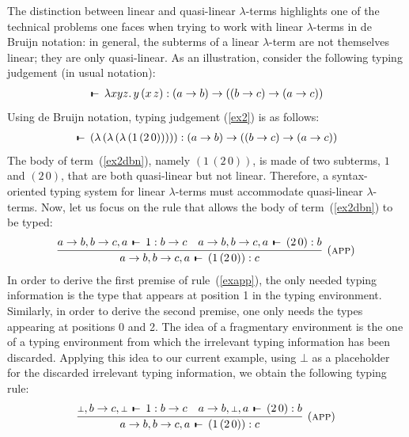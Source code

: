 \documentclass[submission,creativecommons]{eptcs}
\def\joinrelm{\mathrel{\mkern-3mu}}
\def\relbar{\mathrel{\smash-}}
\def\tailpiece{\mathchoice
  {\vrule height 1ex width 0.3ex depth -.1ex}%
  {\vrule height 1ex width 0.3ex depth -.1ex}%
  {\vrule height 0.7ex width 0.3ex depth -.1ex}%
  {\vrule height 0.7ex width 0.3ex depth -.1ex}}
\def\seqsym{\mathrel{\tailpiece\joinrelm\relbar}}
\newcommand{\bt}{{\scriptstyle\bot}}
\newcommand{\iabs}[1]{(\lambda\,#1)}
\newcommand{\iapp}[2]{(#1\,#2)}
\newcommand{\tseq}[3]{#1 \, \seqsym \, #2 : #3}
\begin{document}
The distinction between linear and quasi-linear $\lambda$-terms highlights one of the technical problems one
faces when trying to work with linear $\lambda$-terms in de Bruijn notation: in general, the subterms of a
linear $\lambda$-term are not themselves linear; they are only quasi-linear.
As an illustration, consider the following typing judgement (in usual notation):
\begin{align}\label{ex2}
\tseq{}{\lambda x y z.\,y\,(x\,z)}{(a\rightarrow b)\rightarrow((b\rightarrow c)\rightarrow(a\rightarrow c))}
\end{align}
Using de Bruijn notation, typing judgement (\ref{ex2}) is as follows:
\begin{align}\label{ex2dbn}
  \tseq{}
    {\iabs{\iabs{\iabs{\iapp{1}{\iapp{2}{0}}}}}}
    {(a\rightarrow b)\rightarrow((b\rightarrow c)\rightarrow(a\rightarrow c))}
\end{align}
The body of term~(\ref{ex2dbn}), namely $\iapp{1}{\iapp{2}{0}}$, is made of two subterms, $1$ and $\iapp{2}{0}$,
that are both quasi-linear but not linear.
Therefore, a syntax-oriented typing system for linear $\lambda$-terms must accommodate quasi-linear
$\lambda$-terms.
Now, let us focus on the rule that allows the body of term~(\ref{ex2dbn}) to be typed:
\begin{align}\label{exapp}
  \infer[\mbox{(\textsc{app})}]{
    \tseq{a\rightarrow b, b\rightarrow c, a}{\iapp{1}{\iapp{2}{0}}}{c}
  }{
    \tseq{a\rightarrow b, b\rightarrow c, a}{1}{b\rightarrow c}
    &
    \tseq{a\rightarrow b, b\rightarrow c, a}{\iapp{2}{0}}{b}
  }
\end{align}
In order to derive the first premise of rule~(\ref{exapp}), the only needed typing information is the type that
appears at position 1 in the typing environment. Similarly, in order to derive the second premise, one only
needs the types appearing at positions 0 and 2. The idea of a fragmentary environment is the one of a typing
environment from which the irrelevant typing information has been discarded. Applying this idea to our current
example, using $\bt$ as a placeholder for the discarded irrelevant typing information, we obtain the following
typing rule:
\begin{align}\label{exappf}
  \infer[\mbox{(\textsc{app})}]{
    \tseq{a\rightarrow b, b\rightarrow c, a}{\iapp{1}{\iapp{2}{0}}}{c}
  }{
    \tseq{\bt, b\rightarrow c, \bt}{1}{b\rightarrow c}
    &
    \tseq{a\rightarrow b, \bt, a}{\iapp{2}{0}}{b}
  }
\end{align}
\end{document}
